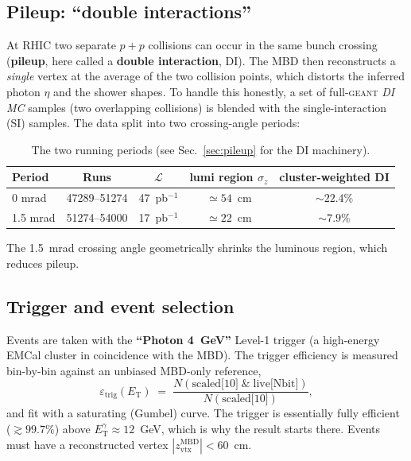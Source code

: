 \documentclass[11pt]{article}
\newcommand{\ET}{E_{\mathrm{T}}}
\newcommand{\ETg}{E_{\mathrm{T}}^{\gamma}}
\newcommand{\pp}{p{+}p}
\begin{document}
\subsection{Pileup: ``double interactions''}

At RHIC two separate $\pp$ collisions can occur in the same bunch crossing (\textbf{pileup}, here
called a \textbf{double interaction}, DI). The MBD then reconstructs a \emph{single} vertex at the
average of the two collision points, which distorts the inferred photon $\eta$ and the shower
shapes. To handle this honestly, a set of full-\textsc{geant} \emph{DI MC} samples (two overlapping
collisions) is blended with the single-interaction (SI) samples. The data split into two
crossing-angle periods:

\begin{table}[h]
\centering
\caption{The two running periods (see Sec.~\ref{sec:pileup} for the DI machinery).}
\begin{tabular}{lcccc}
\toprule
Period & Runs & $\mathcal{L}$ & lumi region $\sigma_z$ & cluster-weighted DI \\
\midrule
0 mrad   & 47289--51274 & 47~pb$^{-1}$ & $\simeq 54$~cm & $\sim 22.4\%$ \\
1.5 mrad & 51274--54000 & 17~pb$^{-1}$ & $\simeq 22$~cm & $\sim 7.9\%$ \\
\bottomrule
\end{tabular}
\end{table}

The 1.5~mrad crossing angle geometrically shrinks the luminous region, which reduces pileup.

\subsection{Trigger and event selection}

Events are taken with the \textbf{``Photon 4~GeV''} Level-1 trigger (a high-energy EMCal cluster in
coincidence with the MBD). The trigger efficiency is measured bin-by-bin against an unbiased
MBD-only reference,
\begin{equation}
  \varepsilon_{\mathrm{trig}}(\ET) \;=\;
  \frac{N(\text{scaled[10]}\;\&\;\text{live[Nbit]})}{N(\text{scaled[10]})},
\end{equation}
and fit with a saturating (Gumbel) curve. The trigger is essentially fully efficient
($\gtrsim 99.7\%$) above $\ETg\approx 12$~GeV, which is why the result starts there. Events must
have a reconstructed vertex $|z_{\mathrm{vtx}}^{\mathrm{MBD}}| < 60$~cm.
\end{document}
